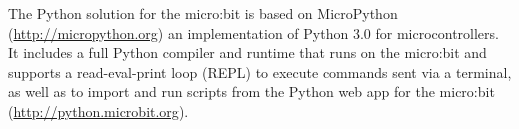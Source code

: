 
The Python solution for the micro:bit is based on MicroPython (\url{http://micropython.org})
an implementation of Python 3.0 for microcontrollers. It includes
a full Python compiler and runtime that runs on the micro:bit and
supports a read-eval-print loop (REPL) to execute commands sent via
a terminal, as well as to import and run scripts from the Python web app for
the micro:bit (\url{http://python.microbit.org}).





